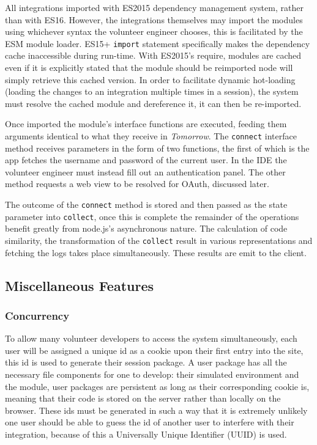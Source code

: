 \documentclass[jou,apacite]{apa6}
\begin{document}
All integrations imported with ES2015 dependency management system, rather than with ES16. However, the integrations themselves may import the modules using whichever syntax the volunteer engineer chooses, this is facilitated by the ESM module loader.  ES15+ \texttt{import} statement specifically makes the dependency cache inaccessible during run-time.  With ES2015's require, modules are cached even if it is explicitly stated that the module should be reimported node will simply retrieve this cached version. In order to facilitate dynamic hot-loading (loading the changes to an integration multiple times in a session), the system must resolve the cached module and dereference it, it can then be re-imported. 

Once imported the module's interface functions are executed, feeding them arguments identical to what they receive in \textit{Tomorrow}. The \texttt{connect} interface method receives parameters in the form of two functions, the first of which is the app fetches the username and password of the current user. In the IDE the volunteer engineer must instead fill out an authentication panel. The other method requests a web view to be resolved for OAuth, discussed later. 

The outcome of the \texttt{connect} method is stored and then passed as the state parameter into \texttt{collect}, once this is complete the remainder of the operations benefit greatly from node.js's asynchronous nature. The calculation of code similarity, the transformation of the \texttt{collect} result in various representations and fetching the logs takes place simultaneously. These results are emit to the client.
\subsection{Miscellaneous Features}
\subsubsection{Concurrency}
To allow many volunteer developers to access the system simultaneously, each user will be assigned a unique id as a cookie upon their first entry into the site, this id is used to generate their session package. A user package has all the necessary file components for one to develop: their simulated environment and the module, user packages are persistent as long as their corresponding cookie is, meaning that their code is stored on the server rather than locally on the browser. These ids must be generated in such a way that it is extremely unlikely one user should be able to guess the id of another user to interfere with their integration, because of this a Universally Unique Identifier (UUID) is used.
\end{document}
